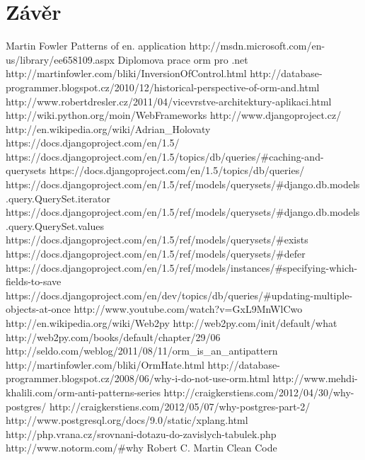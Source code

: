 \documentclass[ing,male,java,dept456]{diploma}						%
\begin{document}
\section{Závěr}
\label{sec:Conclusion}


\begin{thebibliography}{99}

 Martin Fowler Patterns of en. application
 http://msdn.microsoft.com/en-us/library/ee658109.aspx
 Diplomova prace orm pro .net
 http://martinfowler.com/bliki/InversionOfControl.html
 http://database-programmer.blogspot.cz/2010/12/historical-perspective-of-orm-and.html
 http://www.robertdresler.cz/2011/04/vicevrstve-architektury-aplikaci.html
 http://wiki.python.org/moin/WebFrameworks
 http://www.djangoproject.cz/
 http://en.wikipedia.org/wiki/Adrian\_Holovaty
 https://docs.djangoproject.com/en/1.5/
 https://docs.djangoproject.com/en/1.5/topics/db/queries/\#caching-and-querysets
 https://docs.djangoproject.com/en/1.5/topics/db/queries/
 https://docs.djangoproject.com/en/1.5/ref/models/querysets/\#django.db.models.query.QuerySet.iterator
 https://docs.djangoproject.com/en/1.5/ref/models/querysets/\#django.db.models.query.QuerySet.values
 https://docs.djangoproject.com/en/1.5/ref/models/querysets/\#exists
 https://docs.djangoproject.com/en/1.5/ref/models/querysets/\#defer
 https://docs.djangoproject.com/en/1.5/ref/models/instances/\#specifying-which-fields-to-save
 https://docs.djangoproject.com/en/dev/topics/db/queries/\#updating-multiple-objects-at-once
 http://www.youtube.com/watch?v=GxL9MnWlCwo
 http://en.wikipedia.org/wiki/Web2py
 http://web2py.com/init/default/what
 http://web2py.com/books/default/chapter/29/06
 http://seldo.com/weblog/2011/08/11/orm\_is\_an\_antipattern
 http://martinfowler.com/bliki/OrmHate.html
 http://database-programmer.blogspot.cz/2008/06/why-i-do-not-use-orm.html
 http://www.mehdi-khalili.com/orm-anti-patterns-series
 http://craigkerstiens.com/2012/04/30/why-postgres/
 http://craigkerstiens.com/2012/05/07/why-postgres-part-2/
 http://www.postgresql.org/docs/9.0/static/xplang.html
 http://php.vrana.cz/srovnani-dotazu-do-zavislych-tabulek.php
 http://www.notorm.com/\#why
 Robert C. Martin Clean Code
\end{thebibliography}
\end{document}
